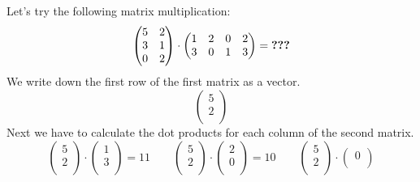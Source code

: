 \begin{examplebox}
    Let's try the following matrix multiplication:
    \[
        \begin{pmatrix}
            5 & 2\\
            3 & 1\\
            0 & 2\\
        \end{pmatrix}
        \cdot
        \begin{pmatrix}
            1 & 2 & 0 & 2\\
            3 & 0 & 1 & 3\\
        \end{pmatrix}
        =
        \text{\textbf{???}}
    \]
    We write down the first row of the first matrix as a vector.
    \[
        \begin{pmatrix}
            5\\
            2\\
        \end{pmatrix}
    \]
    Next we have to calculate the dot products for each column of the second matrix.
    \[
        \begin{pmatrix}
            5\\
            2\\
        \end{pmatrix}
        \cdot
        \begin{pmatrix}
            1\\
            3\\
        \end{pmatrix}
        =
        11
        \qquad
        \begin{pmatrix}
            5\\
            2\\
        \end{pmatrix}
        \cdot
        \begin{pmatrix}
            2\\
            0\\
        \end{pmatrix}
        =
        10
        \qquad
        \begin{pmatrix}
            5\\
            2\\
        \end{pmatrix}
        \cdot
        \begin{pmatrix}
            0\\

\end{pmatrix}\]
\end{examplebox}
